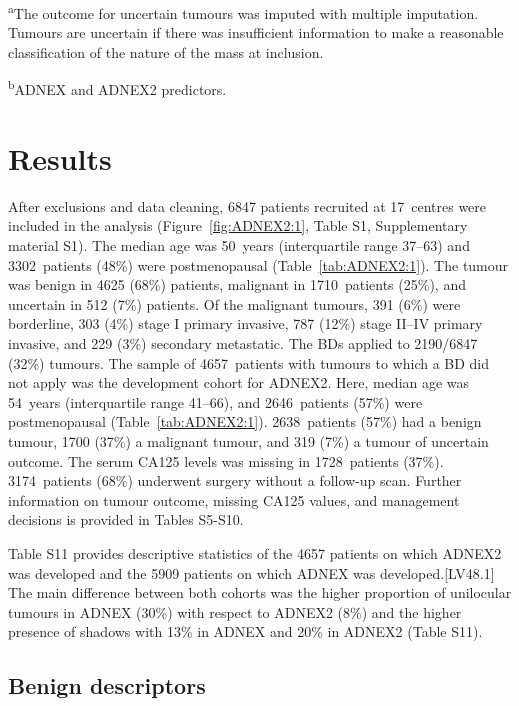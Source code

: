 \begin{table}
{\begin{minipage}[t]{\textwidth}
\textsuperscript{a}The outcome for uncertain tumours was imputed with multiple imputation. Tumours are uncertain if there was insufficient information to make a reasonable classification of the nature of the mass at inclusion.

\textsuperscript{b}ADNEX and ADNEX2 predictors.
\end{minipage}%
}
\end{table}

\section{Results}

After exclusions and data cleaning, 6847 patients recruited at 17~centres were included in the analysis (Figure~\ref{fig:ADNEX2:1}, Table S1, Supplementary material S1). The median age was 50~years (interquartile range 37--63) and 3302~patients (48\%) were postmenopausal (Table~\ref{tab:ADNEX2:1}). The tumour was benign in 4625 (68\%) patients, malignant in 1710~patients (25\%), and uncertain in 512 (7\%) patients. Of the malignant tumours, 391 (6\%) were borderline, 303 (4\%) stage I primary invasive, 787 (12\%) stage II--IV primary invasive, and 229 (3\%) secondary metastatic. The \glspl{BD} applied to 2190/6847 (32\%) tumours. The sample of 4657~patients with tumours to which a \gls{BD} did not apply was the development cohort for ADNEX2. Here, median age was 54~years (interquartile range 41--66), and 2646~patients (57\%) were postmenopausal (Table~\ref{tab:ADNEX2:1}). 2638~patients (57\%) had a benign tumour, 1700 (37\%) a malignant tumour, and 319 (7\%) a tumour of uncertain outcome. The serum \gls{CA125} levels was missing in 1728~patients (37\%). 3174~patients (68\%) underwent surgery without a follow-up scan. Further information on tumour outcome, missing CA125 values, and management decisions is provided in Tables S5-S10. 

Table S11 provides descriptive statistics of the 4657 patients on which ADNEX2 was developed and the 5909 patients on which ADNEX was developed.[LV48.1] The main difference between both cohorts was the higher proportion of unilocular tumours in ADNEX (30\%) with respect to ADNEX2 (8\%) and the higher presence of shadows with 13\% in ADNEX and 20\% in ADNEX2 (Table S11). 

\subsection{Benign descriptors}

